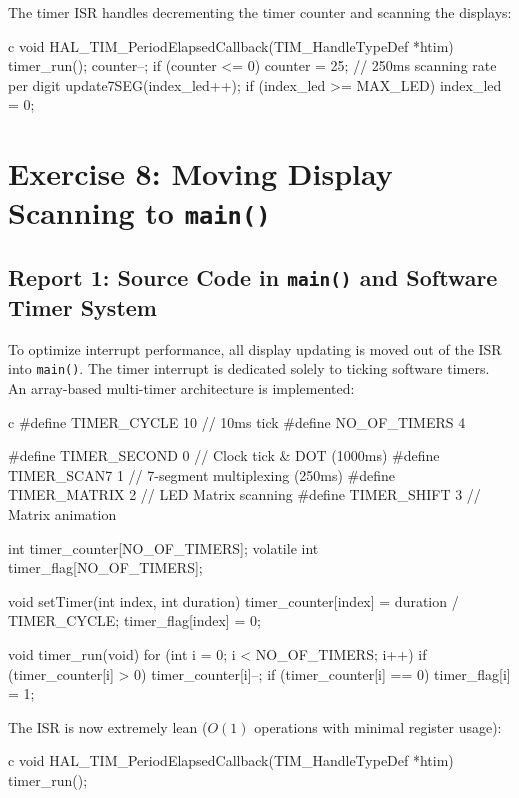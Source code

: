 \documentclass{hcmut-report}
\begin{document}
The timer ISR handles decrementing the timer counter and scanning the displays:
\begin{code}{c}
void HAL_TIM_PeriodElapsedCallback(TIM_HandleTypeDef *htim)
{
    timer_run();
    counter--;
    if (counter <= 0) {
        counter = 25;  // 250ms scanning rate per digit
        update7SEG(index_led++);
        if (index_led >= MAX_LED) index_led = 0;
    }
}
\end{code}

\newpage
\section{Exercise 8: Moving Display Scanning to \texttt{main()}}

\subsection*{Report 1: Source Code in \texttt{main()} and Software Timer System}
To optimize interrupt performance, all display updating is moved out of the ISR into \texttt{main()}. The timer interrupt is dedicated solely to ticking software timers. An array-based multi-timer architecture is implemented:
\begin{code}{c}
#define TIMER_CYCLE  10  // 10ms tick
#define NO_OF_TIMERS 4

#define TIMER_SECOND 0   // Clock tick & DOT (1000ms)
#define TIMER_SCAN7  1   // 7-segment multiplexing (250ms)
#define TIMER_MATRIX 2   // LED Matrix scanning
#define TIMER_SHIFT  3   // Matrix animation

int timer_counter[NO_OF_TIMERS];
volatile int timer_flag[NO_OF_TIMERS];

void setTimer(int index, int duration) {
    timer_counter[index] = duration / TIMER_CYCLE;
    timer_flag[index] = 0;
}

void timer_run(void) {
    for (int i = 0; i < NO_OF_TIMERS; i++) {
        if (timer_counter[i] > 0) {
            timer_counter[i]--;
            if (timer_counter[i] == 0) timer_flag[i] = 1;
        }
    }
}
\end{code}

The ISR is now extremely lean ($O(1)$ operations with minimal register usage):
\begin{code}{c}
void HAL_TIM_PeriodElapsedCallback(TIM_HandleTypeDef *htim)
{
    timer_run();
}
\end{code}
\end{document}
